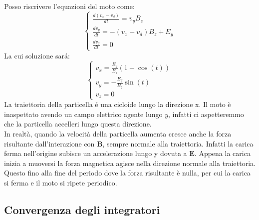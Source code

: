 \documentclass[11pt]{article}
\begin{document}
Posso riscrivere l'equazioni del moto come:
\begin{equation}
\begin{cases} 
\frac{d(v_x - v_d)}{dt}=v_y B_z \\ 
\frac{dv_y}{dt}=-(v_x - v_d)B_z + E_y  \\ 
\frac{dv_z}{dt}=0 
\end{cases}
\end{equation}
La cui soluzione sará:
\begin{equation}
\begin{cases}
v_x = \frac{E_y}{B_z} (1 + \cos(t)) \\
v_y = - \frac{E_y}{B_z}\sin(t) \\
v_z = 0 
\end{cases}
\end{equation}
La traiettoria della particella é una cicloide lungo la direzione x. Il moto è inaspettato avendo un campo elettrico agente lungo $y$, infatti ci aspetteremmo che la particella accelleri lungo questa direzione.\\
In realt\`a, quando la velocit\`a della particella aumenta cresce anche la forza risultante dall'interazione con $\mathbf{B}$, sempre normale alla traiettoria.
Infatti la carica ferma nell'origine subisce un accelerazione lungo y dovuta a $\mathbf{E}$. Appena la carica inizia a muoversi la forza magnetica agisce nella direzione normale alla traiettoria. Questo fino alla fine del periodo dove la forza risultante è nulla, per cui la carica si ferma e il moto si ripete periodico.\\


\subsection{Convergenza degli integratori}
\end{document}
